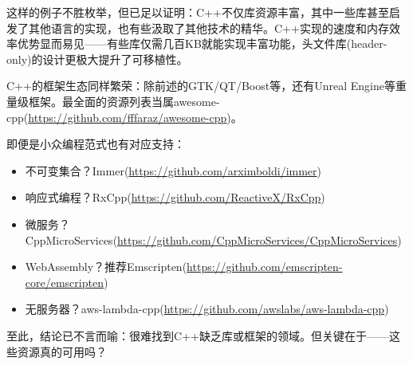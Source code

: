 这样的例子不胜枚举，但已足以证明：C++不仅库资源丰富，其中一些库甚至启发了其他语言的实现，也有些汲取了其他技术的精华。C++实现的速度和内存效率优势显而易见——有些库仅需几百KB就能实现丰富功能，头文件库(header-only)的设计更极大提升了可移植性。

C++的框架生态同样繁荣：除前述的GTK/QT/Boost等，还有Unreal Engine等重量级框架。最全面的资源列表当属awesome-cpp(\url{https://github.com/fffaraz/awesome-cpp})。

即便是小众编程范式也有对应支持：

\begin{itemize}
\item 
不可变集合？Immer(\url{https://github.com/arximboldi/immer})

\item 
响应式编程？RxCpp(\url{https://github.com/ReactiveX/RxCpp})

\item 
微服务？CppMicroServices(\url{https://github.com/CppMicroServices/CppMicroServices})

\item 
WebAssembly？推荐Emscripten(\url{https://github.com/emscripten-core/emscripten})

\item 
无服务器？aws-lambda-cpp(\url{https://github.com/awslabs/aws-lambda-cpp})
\end{itemize}

至此，结论已不言而喻：很难找到C++缺乏库或框架的领域。但关键在于——这些资源真的可用吗？

















